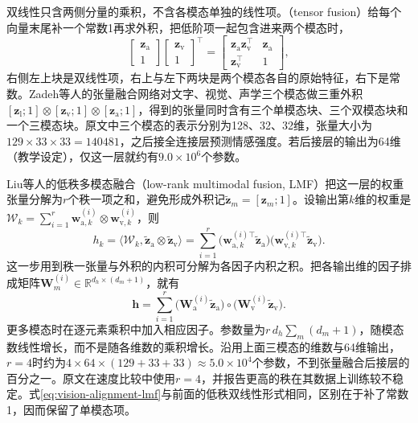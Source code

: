 双线性只含两侧分量的乘积，不含各模态单独的线性项。（tensor fusion）给每个向量末尾补一个常数1再求外积，把低阶项一起包含进来两个模态时，
\[
  \begin{bmatrix}\bm z_{\mathrm a}\\1\end{bmatrix}
  \begin{bmatrix}\bm z_{\mathrm v}\\1\end{bmatrix}^\top
  =\begin{bmatrix}\bm z_{\mathrm a}\bm z_{\mathrm v}^\top&\bm z_{\mathrm a}\\
                  \bm z_{\mathrm v}^\top&1\end{bmatrix},
\]
右侧左上块是双线性项，右上与左下两块是两个模态各自的原始特征，右下是常数。Zadeh等人的张量融合网络对文字、视觉、声学三个模态做三重外积$[\bm z_{\mathrm l};1]\otimes[\bm z_{\mathrm v};1]\otimes[\bm z_{\mathrm a};1]$，得到的张量同时含有三个单模态块、三个双模态块和一个三模态块。原文中三个模态的表示分别为128、32、32维，张量大小为$129\times33\times33=140481$，之后接全连接层预测情感强度。若后接层的输出为64维（教学设定），仅这一层就约有$9.0\times10^6$个参数。

Liu等人的低秩多模态融合（low-rank multimodal fusion, LMF）把这一层的权重张量分解为$r$个秩一项之和，避免形成外积记$\tilde{\bm z}_m=[\bm z_m;1]$。设输出第$k$维的权重是$\mathcal W_k=\sum_{i=1}^{r}\bm w_{\mathrm a,k}^{(i)}\otimes\bm w_{\mathrm v,k}^{(i)}$，则
\[
  h_k=\langle\mathcal W_k,\tilde{\bm z}_{\mathrm a}\otimes\tilde{\bm z}_{\mathrm v}\rangle
  =\sum_{i=1}^{r}\bigl(\bm w_{\mathrm a,k}^{(i)\top}\tilde{\bm z}_{\mathrm a}\bigr)
                 \bigl(\bm w_{\mathrm v,k}^{(i)\top}\tilde{\bm z}_{\mathrm v}\bigr).
\]
这一步用到秩一张量与外积的内积可分解为各因子内积之积。把各输出维的因子排成矩阵$\bm W_m^{(i)}\in\mathbb R^{d_h\times(d_m+1)}$，就有
\begin{equation}
  \bm h=\sum_{i=1}^{r}\bigl(\bm W_{\mathrm a}^{(i)}\tilde{\bm z}_{\mathrm a}\bigr)\circ
        \bigl(\bm W_{\mathrm v}^{(i)}\tilde{\bm z}_{\mathrm v}\bigr).
  \label{eq:vision-alignment-lmf}
\end{equation}
更多模态时在逐元素乘积中加入相应因子。参数量为$r\,d_h\sum_m(d_m+1)$，随模态数线性增长，而不是随各维数的乘积增长。沿用上面三模态的维数与64维输出，$r=4$时约为$4\times64\times(129+33+33)\approx5.0\times10^4$个参数，不到张量融合后接层的百分之一。原文在速度比较中使用$r=4$，并报告更高的秩在其数据上训练较不稳定。式\eqref{eq:vision-alignment-lmf}与前面的低秩双线性形式相同，区别在于补了常数1，因而保留了单模态项。

